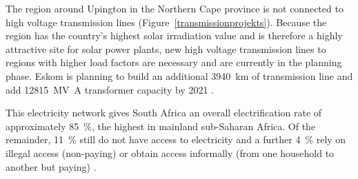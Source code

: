 
The region around Upington in the Northern Cape province is not connected to high voltage transmission lines (Figure~\ref{transmissionprojekts}). Because the region has the country's highest solar irradiation value and is therefore a highly attractive site for solar power plants, new high voltage transmission lines to regions with higher load factors are necessary and are currently in the planning phase. Eskom is planning to build an additional \SI{3940}{\kilo\meter} of transmission line and add \SI{12815}{\mega\volt\ampere} transformer capacity by 2021 \cite{Eskom2015a}.

This electricity network gives South Africa an overall electrification rate of approximately \SI{85}{\percent}, the highest in mainland sub-Saharan Africa. Of the remainder, \SI{11}{\percent} still do not have access to electricity and a further \SI{4}{\percent} rely on illegal access (non-paying) or obtain access informally (from one household to another but paying) \cite{IEA2014f}.

